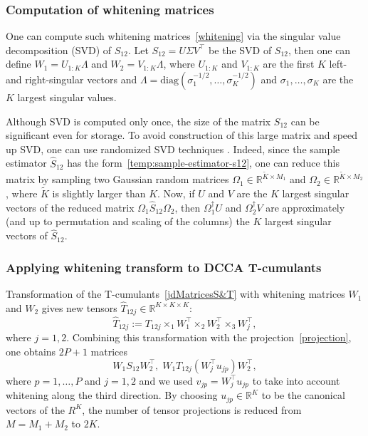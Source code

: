 \documentclass{article}
\newcommand{\wh}[1]{\widehat{#1}}
\newcommand{\diag}{\mathrm{diag}}
\newcommand{\R}{\mathbb{R}}
\begin{document}
\subsubsection{Computation of whitening matrices}
\label{app:compute-whitening}
One can compute such whitening matrices~\eqref{whitening} via the singular value decomposition (SVD) of $S_{12}$. Let $S_{12} = U \Sigma V^{\top}$ be the SVD of $S_{12}$, then one can define $W_1 = U_{1:K} \Lambda$ and $W_2 = V_{1:K} \Lambda$, where $U_{1:K}$ and $V_{1:K}$ are the first $K$ left- and right-singular vectors and $\Lambda=\diag( \sigma_1^{-1/2},\dots,\sigma_K^{-1/2})$ and $\sigma_1,\dots,\sigma_K$ are the $K$ largest singular values. 

Although SVD is computed only once, the size of the matrix $S_{12}$ can be significant even for storage. To avoid construction of this large matrix and speed up SVD, one can use randomized SVD techniques \citep{HalEtAl2011}. Indeed, since the sample estimator $\wh{S}_{12}$ has the form~\eqref{temp:sample-estimator-s12}, one can reduce this matrix by sampling two Gaussian random matrices $\Omega_1 \in\R^{\tilde{K} \times M_1}$ and $\Omega_2 \in\R^{\tilde{K} \times M_2}$, where $\tilde{K}$ is slightly larger than $K$. Now, if $U$ and $V$ are the $K$ largest singular vectors of the reduced matrix $\Omega_1 \wh{S}_{12} \Omega_2$, then $\Omega_1^{\dagger} U$ and $\Omega_2^{\dagger} V$ are approximately (and up to permutation and scaling of the columns) the $K$ largest singular vectors of $\wh{S}_{12}$.

\subsubsection{Applying whitening transform to DCCA T-cumulants}
\label{app:whiten-t-cumulants}
Transformation of the T-cumulants~\eqref{jdMatricesS&T} with whitening matrices $W_1$ and $W_2$ gives new tensors $\wh{T}_{12j} \in\R^{K\times K\times K}$:
\begin{equation}\label{rrrr}
\wh{T}_{12j} := T_{12j} \times_1 W_1^{\top} \times_2 W_2^{\top} \times_3 W_j^{\top},
\end{equation}
where $j=1,2$. Combining this transformation with the projection~\eqref{projection}, one obtains $2P+1$ matrices
\begin{equation}\label{jdmatricesS&Twhitened}
W_1S_{12}W_2^{\top},\; W_1 T_{12j}(W^{\top}_j u_{jp}) W_2^{\top},
\end{equation}
where $p=1,\dots,P$ and $j=1,2$ and we used $v_{jp} = W_j^{\top} u_{jp}$ to take into account whitening along the third direction. By choosing $u_{jp}\in\R^K$ to be the canonical vectors of the $R^K$, the number of tensor projections is reduced from $M=M_1+M_2$ to $2K$.
\end{document}
